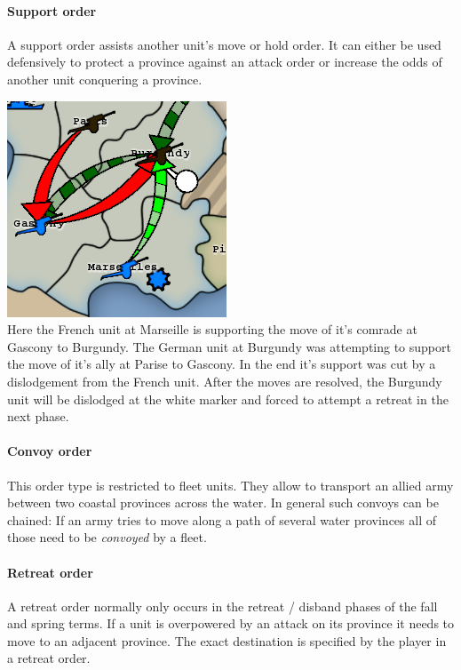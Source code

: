 \documentclass[pdftex,12pt,a4paper]{report}
\begin{document}
\paragraph{Support order}
A support order assists another unit's move or hold order. It can
either be used defensively to protect a province against an attack
order or increase the odds of another unit conquering a province.

\includegraphics{./screenshots/DefRetreat0.png} \\[1cm]
Here the French unit at Marseille is supporting the move of it's
comrade at Gascony to Burgundy. The German unit at Burgundy was
attempting to support the move of it's ally at Parise to Gascony. In
the end it's support was cut by a dislodgement from the French
unit. After the moves are resolved, the Burgundy unit will be
dislodged at the white marker and forced to attempt a retreat in the
next phase.

\paragraph{Convoy order}
This order type is restricted to fleet units. They allow to transport
an allied army between two coastal provinces across the water. In general
such convoys can be chained: If an army tries to move along a path of
several water provinces all of those need to be \textit{convoyed} 
by a fleet.

\paragraph{Retreat order}
A retreat order normally only occurs in the retreat / disband phases of the
fall and spring terms. If a unit is overpowered by an attack on its
province it needs to move to an adjacent province. The exact destination
is specified by the player in a retreat order.
\end{document}
